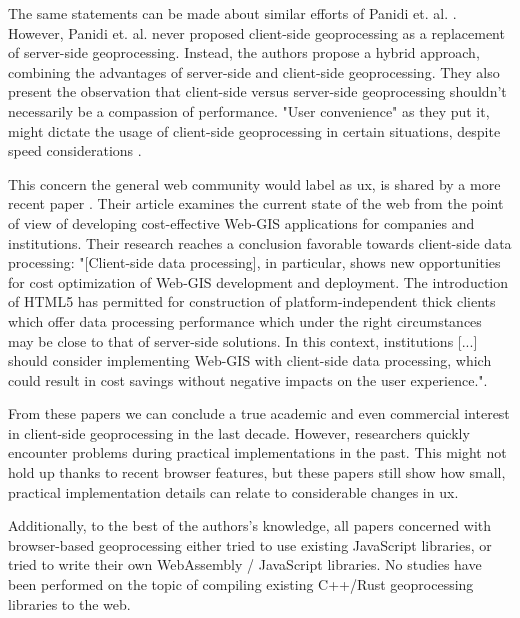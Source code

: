 The same statements can be made about similar efforts of Panidi et. al. \cite{panidi_hybrid_2015}. 
However, Panidi et. al. never proposed client-side geoprocessing as a replacement of server-side geoprocessing. Instead, the authors propose a hybrid approach, combining the advantages of server-side and client-side geoprocessing. 
They also present the observation that client-side versus server-side geoprocessing shouldn't necessarily be a compassion of performance. 
"User convenience" as they put it, might dictate the usage of client-side geoprocessing in certain situations, despite speed considerations \cite{panidi_hybrid_2015}. 

This concern the general web community would label as \ac{ux}, is shared by a more recent paper \cite{kulawiak_analysis_2019}. 
Their article examines the current state of the web from the point of view of developing cost-effective Web-GIS applications for companies and institutions. 
Their research reaches a conclusion favorable towards client-side data processing: "[Client-side data processing], in particular, shows new opportunities for cost optimization of Web-GIS development and deployment. 
The introduction of HTML5 has permitted for construction of platform-independent thick clients which offer data processing performance which under the right circumstances may be close to that of server-side solutions. 
In this context, institutions [...] should consider implementing Web-GIS with client-side data processing, which could result in cost savings without negative impacts on the user experience.".


From these papers we can conclude a true academic and even commercial interest in client-side geoprocessing in the last decade. However, researchers quickly encounter problems during practical implementations in the past. This might not hold up thanks to recent browser features, but these papers still show how small, practical implementation details can relate to considerable changes in \ac{ux}. 

Additionally, to the best of the authors's knowledge, all papers concerned with browser-based geoprocessing either tried to use existing JavaScript libraries, or tried to write their own WebAssembly / JavaScript libraries. No studies have been performed on the topic of compiling existing C++/Rust geoprocessing libraries to the web. 




